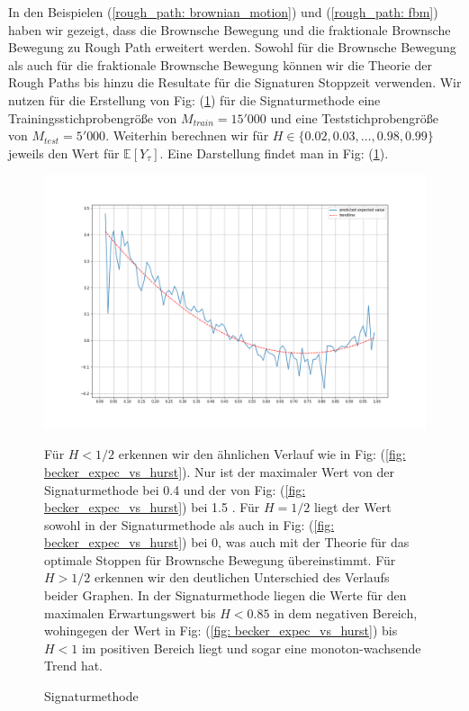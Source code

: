 \documentclass[12pt,titlepage,headsepline]{article}
\begin{document}
      \hfill\break
      In den Beispielen (\ref{rough_path: brownian_motion}) und (\ref{rough_path: fbm}) haben wir gezeigt, dass die Brownsche Bewegung und die fraktionale Brownsche Bewegung zu Rough Path erweitert werden. Sowohl für die Brownsche Bewegung als auch für die fraktionale Brownsche Bewegung können wir die Theorie der Rough Paths bis hinzu die Resultate für die Signaturen Stoppzeit verwenden.
      \hfill\break
      Wir nutzen für die Erstellung von Fig: (\ref{fig: signatur_methode}) für die Signaturmethode eine Trainingsstichprobengröße von $M_{train}=15'000$ und eine Teststichprobengröße von $M_{test}=5'000$. Weiterhin berechnen wir für $H \in \{0.02,0.03,\ldots,0.98,0.99\}$ jeweils den Wert für $\mathbb{E}[Y_{\tau}]$. Eine Darstellung findet man in Fig:
      (\ref{fig: signatur_methode}).
      \begin{figure}[H]
        \caption{Signaturmethode}\label{fig: signatur_methode}
        \centering
        \includegraphics[width=\textwidth]{signatur_methode.png}
        {\footnotesize
        Für $H<1/2$ erkennen wir den ähnlichen Verlauf wie in Fig: (\ref{fig: becker_expec_vs_hurst}). Nur ist der maximaler Wert von der Signaturmethode bei 0.4 und der von Fig: (\ref{fig: becker_expec_vs_hurst}) bei 1.5 . Für $H=1/2$ liegt der Wert sowohl in der Signaturmethode als auch in Fig: (\ref{fig: becker_expec_vs_hurst}) bei 0, was auch mit der Theorie für das optimale Stoppen für Brownsche Bewegung übereinstimmt. Für $H>1/2$ erkennen wir den deutlichen Unterschied des Verlaufs beider Graphen. In der Signaturmethode liegen die Werte für den maximalen Erwartungswert bis $H<0.85$ in dem negativen Bereich, wohingegen der Wert in Fig: (\ref{fig: becker_expec_vs_hurst}) bis $H<1$ im positiven Bereich liegt und sogar eine monoton-wachsende Trend hat.
        \par}
      \end{figure}
\end{document}
